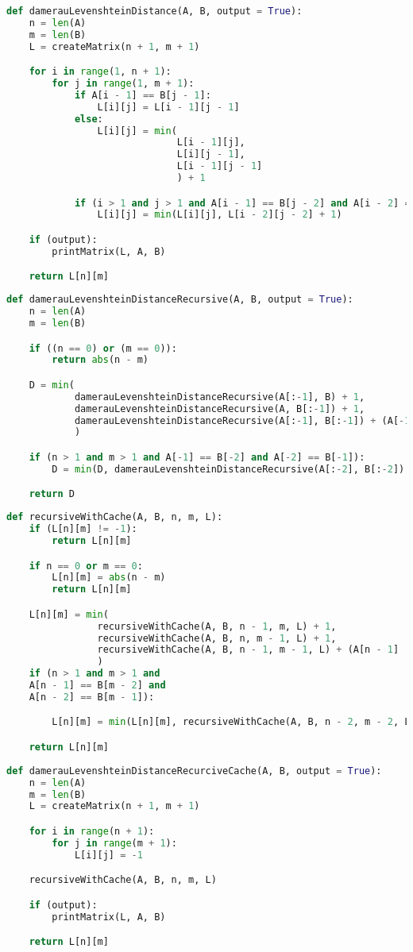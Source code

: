 \begin{lstlisting}[language = Python,label=lst:non_rec_dl,caption=Функция нахождения расстояния Дамерау--Левенштейна нерекурсивным методом]
def damerauLevenshteinDistance(A, B, output = True):
	n = len(A)
	m = len(B)
	L = createMatrix(n + 1, m + 1)

	for i in range(1, n + 1):
		for j in range(1, m + 1):
			if A[i - 1] == B[j - 1]:
				L[i][j] = L[i - 1][j - 1]
			else:
				L[i][j] = min(
							  L[i - 1][j],
							  L[i][j - 1],
							  L[i - 1][j - 1]
							  ) + 1

			if (i > 1 and j > 1 and A[i - 1] == B[j - 2] and A[i - 2] == B[j - 1]):
				L[i][j] = min(L[i][j], L[i - 2][j - 2] + 1)

	if (output):
		printMatrix(L, A, B)

	return L[n][m]
\end{lstlisting}

\begin{lstlisting}[language = Python,label=lst:rec_dl,caption=Функция нахождения расстояния Дамерау--Левенштейна с использованием рекурсии]
def damerauLevenshteinDistanceRecursive(A, B, output = True):
	n = len(A)
	m = len(B)

	if ((n == 0) or (m == 0)):
		return abs(n - m)

	D = min(
			damerauLevenshteinDistanceRecursive(A[:-1], B) + 1,
			damerauLevenshteinDistanceRecursive(A, B[:-1]) + 1,
			damerauLevenshteinDistanceRecursive(A[:-1], B[:-1]) + (A[-1] != B[-1])
			)

	if (n > 1 and m > 1 and A[-1] == B[-2] and A[-2] == B[-1]):
		D = min(D, damerauLevenshteinDistanceRecursive(A[:-2], B[:-2]) + 1)

	return D

\end{lstlisting}

\begin{lstlisting}[language = Python,label=lst:rec_dl_cache,caption=Функция нахождения расстояния Дамерау--Левенштейна рекурсивным методом с использованием кеша]
def recursiveWithCache(A, B, n, m, L):
	if (L[n][m] != -1):
		return L[n][m]

	if n == 0 or m == 0:
		L[n][m] = abs(n - m)
		return L[n][m]

	L[n][m] = min(
				recursiveWithCache(A, B, n - 1, m, L) + 1,
				recursiveWithCache(A, B, n, m - 1, L) + 1,
				recursiveWithCache(A, B, n - 1, m - 1, L) + (A[n - 1] != B[m - 1])
				)
	if (n > 1 and m > 1 and
	A[n - 1] == B[m - 2] and
	A[n - 2] == B[m - 1]):

		L[n][m] = min(L[n][m], recursiveWithCache(A, B, n - 2, m - 2, L) + 1)

	return L[n][m]
	
def damerauLevenshteinDistanceRecurciveCache(A, B, output = True):
	n = len(A)
	m = len(B)
	L = createMatrix(n + 1, m + 1)

	for i in range(n + 1):
		for j in range(m + 1):
			L[i][j] = -1

	recursiveWithCache(A, B, n, m, L)

	if (output):
		printMatrix(L, A, B)

	return L[n][m]

\end{lstlisting}

